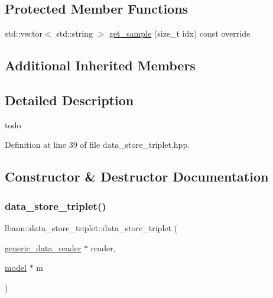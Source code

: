 \subsection*{Protected Member Functions}
\begin{DoxyCompactItemize}
\item 
std\+::vector$<$ std\+::string $>$ \hyperlink{classlbann_1_1data__store__triplet_ade5d2290c85e7916e828553f4ab4f379}{get\+\_\+sample} (size\+\_\+t idx) const override
\end{DoxyCompactItemize}
\subsection*{Additional Inherited Members}


\subsection{Detailed Description}
todo 

Definition at line 39 of file data\+\_\+store\+\_\+triplet.\+hpp.



\subsection{Constructor \& Destructor Documentation}
\mbox{\label{classlbann_1_1data__store__triplet_ad6ba997401d292ffb9678a75e02a258f}} 
\subsubsection{\texorpdfstring{data\+\_\+store\+\_\+triplet()}{data\_store\_triplet()}\hspace{0.1cm}{\footnotesize\ttfamily [1/2]}}
{\footnotesize\ttfamily lbann\+::data\+\_\+store\+\_\+triplet\+::data\+\_\+store\+\_\+triplet (\begin{DoxyParamCaption}\item[{\hyperlink{classlbann_1_1generic__data__reader}{generic\+\_\+data\+\_\+reader} $\ast$}]{reader,  }\item[{\hyperlink{classlbann_1_1model}{model} $\ast$}]{m }\end{DoxyParamCaption})\hspace{0.3cm}{\ttfamily [inline]}}



